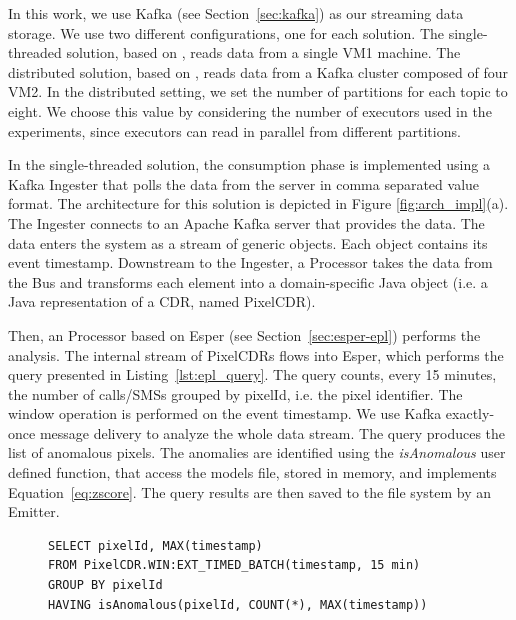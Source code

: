 {In this work, we use Kafka (see Section~\ref{sec:kafka}) as our streaming data storage. We use two different configurations, one for each solution. The single-threaded solution, based on \sti{}, reads data from a single VM1 machine. The distributed solution, based on \sparkdi{}, reads data from a Kafka cluster composed of four VM2. In the distributed setting, we set the number of partitions for each topic to eight. We choose this value by considering the number of executors used in the experiments, since executors can read in parallel from different partitions.

In the single-threaded solution, the consumption phase is implemented using a Kafka Ingester that polls the data from the server in comma separated value format. The architecture for this solution is depicted in Figure \ref{fig:arch_impl}(a). The Ingester connects to an Apache Kafka server that provides the data. The data enters the system as a stream of generic objects. Each object contains its event timestamp. Downstream to the Ingester, a Processor takes the data from the Bus and transforms each element into a domain-specific Java object (i.e. a Java representation of a CDR, named PixelCDR).

Then, an Processor based on Esper (see Section~\ref{sec:esper-epl}) performs the analysis. The internal stream of PixelCDRs flows into Esper, which performs the query presented in Listing~\ref{lst:epl_query}. The query counts, every 15 minutes, the number of calls/SMSs grouped by pixelId, i.e. the pixel identifier.
The window operation is performed on the event timestamp. We use Kafka exactly-once message delivery to analyze the whole data stream. The query produces the list of anomalous pixels.
The anomalies are identified using the \textit{isAnomalous} user defined function, that access the models file, stored in memory, and implements Equation~\eqref{eq:zscore}.
The query results are then saved to the file system by an Emitter.

\begin{figure}[ht]
\begin{minipage}{0.95\linewidth}
\begin{lstlisting}[caption={EPL query performed by Esper Processor.},frame=single,captionpos=b,label=lst:epl_query,style=ESPER]
SELECT pixelId, MAX(timestamp)
FROM PixelCDR.WIN:EXT_TIMED_BATCH(timestamp, 15 min) 
GROUP BY pixelId 
HAVING isAnomalous(pixelId, COUNT(*), MAX(timestamp))
\end{lstlisting}
\end{minipage}
\end{figure}

}
